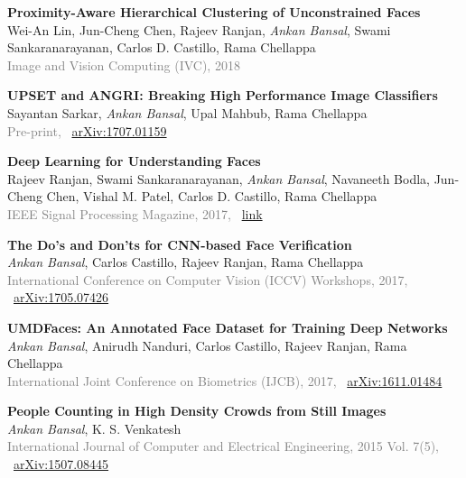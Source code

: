 \documentclass[11pt, a4paper]{article}
\begin{document}
\vspace{4pt}

\textbf{Proximity-Aware Hierarchical Clustering of Unconstrained Faces} \\
Wei-An Lin, Jun-Cheng Chen, Rajeev Ranjan, \textit{Ankan Bansal}, Swami Sankaranarayanan, Carlos D.
Castillo, Rama Chellappa\\
\textcolor{gray}{Image and Vision Computing (IVC), 2018}

\vspace{4pt}

\textbf{UPSET and ANGRI: Breaking High Performance Image Classifiers} \\
Sayantan Sarkar, \textit{Ankan Bansal}, Upal Mahbub, Rama Chellappa\\
\textcolor{gray}{Pre-print,} ~\href{https://arxiv.org/abs/1707.01159}{arXiv:1707.01159}

\vspace{4pt}

\textbf{Deep Learning for Understanding Faces} \\
Rajeev Ranjan, Swami Sankaranarayanan, \textit{Ankan Bansal}, Navaneeth Bodla, Jun-Cheng Chen, Vishal
M. Patel,  Carlos D. Castillo, Rama Chellappa\\
\textcolor{gray}{IEEE Signal Processing Magazine, 2017,} ~\href{https://ieeexplore.ieee.org/abstract/document/8253595}{link}

\vspace{4pt}

\textbf{The Do's and Don'ts for CNN-based Face Verification} \\
\textit{Ankan Bansal}, Carlos Castillo, Rajeev Ranjan, Rama Chellappa\\
\textcolor{gray}{International Conference on Computer Vision (ICCV) Workshops, 2017,} ~\href{https://arxiv.org/abs/1705.07426}{arXiv:1705.07426}

\vspace{4pt}

\textbf{UMDFaces: An Annotated Face Dataset for Training Deep Networks} \\
\textit{Ankan Bansal}, Anirudh Nanduri, Carlos Castillo, Rajeev Ranjan, Rama Chellappa\\
\textcolor{gray}{International Joint Conference on Biometrics (IJCB), 2017,} ~\href{https://arxiv.org/abs/1611.01484}{arXiv:1611.01484}

\vspace{4pt}

\textbf{People Counting in High Density Crowds from Still Images} \\
\textit{Ankan Bansal}, K. S. Venkatesh\\
\textcolor{gray}{International Journal of Computer and Electrical Engineering, 2015 Vol. 7(5),} ~\href{https://arxiv.org/abs/1507.08445}{arXiv:1507.08445}
\end{document}

